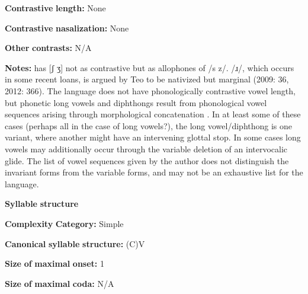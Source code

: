\documentclass[output=paper]{langsci/langscibook}
\begin{document}
\begin{styleBody}
\textbf{Contrastive} \textbf{length:} None
\end{styleBody}

\begin{styleBody}
\textbf{Contrastive} \textbf{nasalization:} None
\end{styleBody}

\begin{styleBody}
\textbf{Other} \textbf{contrasts:} N/A
\end{styleBody}

\begin{styleBody}
\textbf{Notes:} \citet{Sreedhar1980} has [ʃ ʒ] not as contrastive but as allophones of /s z/. /ɹ/, which occurs in some recent loans, is argued by Teo to be nativized but marginal (2009: 36, 2012: 366). The language does not have phonologically contrastive vowel length, but phonetic long vowels and diphthongs result from phonological vowel sequences arising through morphological concatenation \citep[58-9]{Teo2009}. In at least some of these cases (perhaps all in the case of long vowels?), the long vowel/diphthong is one variant, where another might have an intervening glottal stop. In some cases long vowels may additionally occur through the variable deletion of an intervocalic glide. The list of vowel sequences given by the author does not distinguish the invariant forms from the variable forms, and may not be an exhaustive list for the language.
\end{styleBody}

\begin{styleBody}
\textbf{Syllable} \textbf{structure}
\end{styleBody}

\begin{styleBody}
\textbf{Complexity} \textbf{Category:} Simple
\end{styleBody}

\begin{styleBody}
\textbf{Canonical} \textbf{syllable} \textbf{structure:} (C)V \citep[57-64]{Teo2009}
\end{styleBody}

\begin{styleBody}
\textbf{Size} \textbf{of} \textbf{maximal} \textbf{onset:} 1
\end{styleBody}

\begin{styleBody}
\textbf{Size} \textbf{of} \textbf{maximal} \textbf{coda:} N/A
\end{styleBody}
\end{document}
